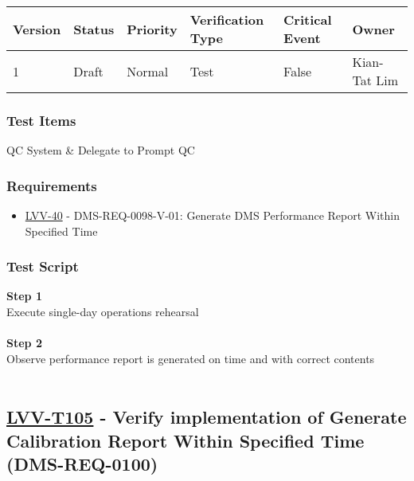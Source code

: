 \begin{longtable}[]{@{}llllll@{}}
\toprule
Version & Status & Priority & Verification Type & Critical Event &
Owner\tabularnewline
\midrule
\endhead
1 & Draft & Normal & Test & False & Kian-Tat Lim\tabularnewline
\bottomrule
\end{longtable}

\hypertarget{test-items-4}{%
\subsubsection{Test Items}\label{test-items-4}}

QC System \& Delegate to Prompt QC

\hypertarget{requirements-4}{%
\subsubsection{Requirements}\label{requirements-4}}

\begin{itemize}
\tightlist
\item
  \href{https://jira.lsstcorp.org/browse/LVV-40}{LVV-40} -
  DMS-REQ-0098-V-01: Generate DMS Performance Report Within Specified
  Time
\end{itemize}

\hypertarget{test-script-4}{%
\subsubsection{Test Script}\label{test-script-4}}

\textbf{Step 1}\\
Execute single-day operations rehearsal\\
~\\
\textbf{Step 2}\\
Observe performance report is generated on time and with correct
contents\\
~\\

\hypertarget{lvv-t105---verify-implementation-of-generate-calibration-report-within-specified-time-dms-req-0100}{%
\subsection{\texorpdfstring{\href{https://jira.lsstcorp.org/secure/Tests.jspa\#/testCase/LVV-T105}{LVV-T105}
- Verify implementation of Generate Calibration Report Within Specified
Time
(DMS-REQ-0100)}{LVV-T105 - Verify implementation of Generate Calibration Report Within Specified Time (DMS-REQ-0100)}}\label{lvv-t105---verify-implementation-of-generate-calibration-report-within-specified-time-dms-req-0100}}

